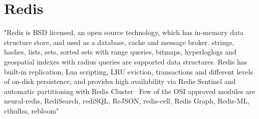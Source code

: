 \section{Redis}

"Redis is BSD licensed, an open source technology, which has in-memory data structure store, and
used as a database, cache and message broker. strings, hashes, lists, sets, sorted sets with 
range queries, bitmaps, hyperloglogs and geospatial indexes with radius queries are supported
data structures. Redis has built-in replication, Lua scripting, LRU eviction, transactions and
different levels of on-disk persistence, and provides high availability via Redis Sentinel and
automatic partitioning with Redis Cluster~\cite{Redis}
Few of the OSI approved modules are neural-redis, RediSearch, rediSQL, ReJSON, redis-cell, 
Redis Graph, Redis-ML, cthulhu, rebloom"~\cite{Redis-Modules}
